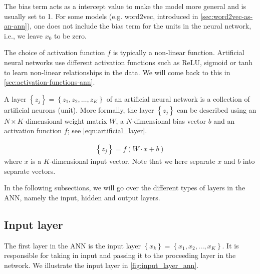 The bias term acts as a intercept value to make the model more general and is usually set to 1. For some models (e.g. word2vec, introduced in \cref{sec:word2vec-as-an-ann}), one does not include the bias term for the units in the neural network, i.e., we leave $x_0$ to be zero.

The choice of activation function $f$ is typically a non-linear function. Artificial neural networks use different activation functions such as ReLU, sigmoid or tanh to learn non-linear relationships in the data. We will come back to this in \cref{sec:activation-functions-ann}.

\newcommand{\layer}[2]{\left\{ {#1}_{#2} \right\}}

\begin{definition}
\label{def:layer_ann}
A layer $\layer{z}{j} = \left\{ z_1, z_2, \ldots, z_K \right\}$ of an artificial neural network is a collection of artificial neurons (unit). More formally, the layer $\layer{z}{j}$ can be described using an $N \times K$-dimensional weight matrix $W$, a $N$-dimensional bias vector $b$ and an activation function $f$; see \cref{eqn:artificial_layer}.
\end{definition}

\begin{align}
    \layer{z}{j} = f \left( W \cdot x + b \right)
    \label{eqn:artificial_layer}
\end{align}
where $x$ is a $K$-dimensional input vector. Note that we here separate $x$ and $b$ into separate vectors.

In the following subsections, we will go over the different types of layers in the ANN, namely the input, hidden and output layers.

\subsection{Input layer}
\label{sec:ann-input-layer}
The first layer in the ANN is the input layer $\layer{x}{k} = \left\{ x_1, x_2, \ldots, x_K \right\}$. It is responsible for taking in input and passing it to the proceeding layer in the network. We illustrate the input layer in \cref{fig:input_layer_ann}.

